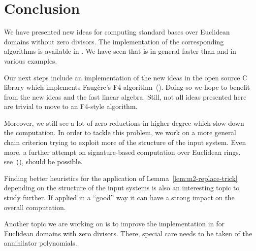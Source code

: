 \section{Conclusion}
We have presented new ideas for computing standard bases over Euclidean domains
without zero divisors.
The implementation of the corresponding algorithms is available in \singular. We
have seen that \singular is in general faster than \macaulay and \magma in
various examples.

Our next steps include an implementation of the new ideas in the open source C library
\gbl which implements Faug\`ere's F4 algorithm~(\cite{gbl}). Doing so we hope to
benefit from the new ideas and the fast linear algebra. Still, not all ideas
presented here are trivial to move to an F4-style algorithm.

Moreover, we still see a lot of zero reductions in higher degree which slow down
the computation. In order to tackle this problem, we work on a more general chain
criterion trying to exploit more of the structure of the input system. Even
more, a further attempt on signature-based computation over Euclidean rings,
see~(\cite{eppSigZ2017}), should be possible.

Finding better heuristics for the application of
Lemma~\ref{lem:m2-replace-trick} depending on the structure of the input systems
is also an interesting topic to study further. If applied in a ``good'' way it
can have a strong impact on the overall computation.

Another topic we are working on is to improve the implementation in \singular
for Euclidean domains with zero divisors. There, special care needs to be
taken of the annihilator polynomials.
